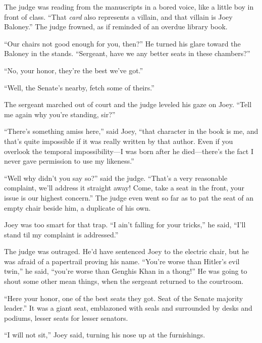 \documentclass[oneside]{book}
\begin{document}
The judge was reading from the manuscripts in a bored voice,
like a little boy in front of class.
``That \emph{card} also represents a villain,
and that villain is Joey Baloney.''  
The judge frowned,
as if reminded of an overdue library book.

``Our chairs not good enough for you, then?''  He turned his glare toward
the Baloney in the stands.
``Sergeant, have we any better seats in these chambers?''

``No, your honor, they're the best we've got.''

``Well, the Senate's nearby, fetch some of theirs.''

The sergeant marched out of court and the judge leveled his gaze on Joey.
``Tell me again why you're standing, sir?''

``There's something amiss here,'' said Joey, ``that character in the book is me,
and that's quite impossible if it was really written by that author.
Even if you overlook the temporal impossibility---I was born after he
died---there's the fact I never gave permission to use my likeness.''

``Well why didn't you say so?'' said the judge.  ``That's a very reasonable
complaint, we'll address it straight away!  Come, take a seat in the front,
your issue is our highest concern.''  The judge even went so far as to pat the
seat of an empty chair beside him, a duplicate of his own.

Joey was too smart for that trap.  ``I ain't falling for your tricks,''
he said, ``I'll stand til my complaint is addressed.''

The judge was outraged.  He'd have sentenced Joey to the electric chair,
but he was afraid of a papertrail proving his name.
``You're worse than Hitler's evil twin,''
he said, ``you're worse than Genghis Khan in a thong!''  He was going to shout some
other mean things, when the sergeant returned to the courtroom.

``Here your honor, one of the best seats they got.  Seat of the Senate majority
leader.''  It was a giant seat, emblazoned with seals and surrounded by
desks and podiums, lesser seats for lesser senators.

``I will not sit,'' Joey said, turning his nose up at the furnishings.
\end{document}
